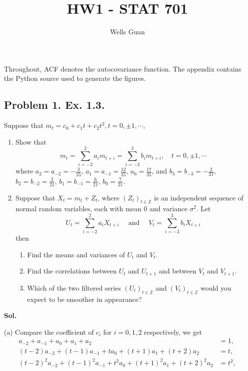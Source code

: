 \documentclass[lang=en,11pt,a4paper,citestyle =authoryear]{elegantpaper}
\title{HW1 - STAT 701}
\author{Wells Guan}
\begin{document}
\maketitle

\noindent Throughout, ACF denotes the autocovariance function.
The appendix contains the Python source used to generate the figures.

\subsection*{Problem 1. Ex. 1.3.} 

Suppose that $m_t = c_0 + c_1 t + c_2 t^2 , t = 0, \pm 1, \cdots$,
\begin{enumerate}
    \item[(a)] Show that
    \[
    m_t = \sum\limits_{i=-2}^2 a_im_{t+i} = \sum\limits_{i=-3}^3 b_im_{t+i},\quad t = 0,\pm 1,\cdots
    \]
where $a_2 = a_{-2} = -\tfrac{3}{35}$, $a_1 = a_{-1} = \tfrac{12}{35}$, $a_0 = \tfrac{17}{35}$, and $b_3 = b_{-3} = -\tfrac{2}{21}$, $b_2 = b_{-2} = \tfrac{3}{21}$, $b_1 = b_{-1} = \tfrac{6}{21}$, $b_0 = \tfrac{7}{21}$.
    \item[(b)] Suppose that $X_t= m_t + Z_t$, where $(Z_t)_{t\in\mathbb{Z}}$ is an independent sequence of normal random variables, each with mean $0$ and variance $\sigma^2$. Let \[U_t = \sum\limits_{i=-2}^2 a_iX_{t+i}\quad \text{ and }\quad V_t = \sum\limits_{i=-3}^3 b_iX_{t+i}\] then
    \begin{enumerate}
        \item[(i)] Find the means and variances of $U_t$ and $V_t$.
        \item[(ii)] Find the correlations between $U_t$ and $U_{t+ 1}$ and between $V_t$ and $V_{t+1}$.
        \item[(iii)] Which of the two filtered series $(U_t)_{t\in\mathbb{Z}}$ and $(V_t)_{t\in\mathbb{Z}}$ would you expect to be smoother in appearance?
    \end{enumerate}
\end{enumerate}
\vspace{0.5em}
\textbf{Sol.} \par
(a) Compare the coefficient of $c_i$ for $i = 0,1,2$ respectively, we get
\[
\begin{aligned}
    a_{-2} + a_{-1} + a_0 + a_1 + a_2 &= 1, \\
    (t-2)a_{-2} + (t-1)a_{-1} + ta_0 + (t+1)a_1 + (t+2)a_2 &= t, \\
    (t-2)^2a_{-2} + (t-1)^2a_{-1} + t^2a_0 + (t+1)^2a_1 + (t+2)^2a_2 &= t^2,\\
\end{aligned}
\]
\end{document}
